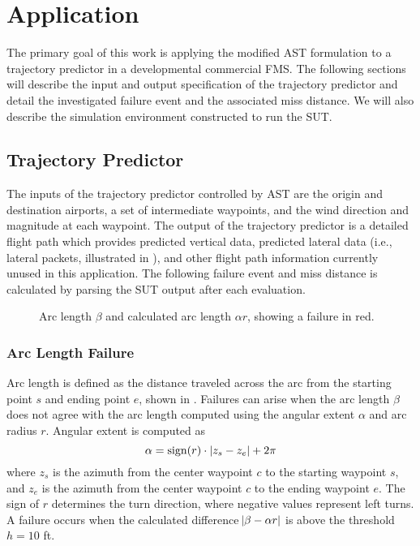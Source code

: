 \section{Application}
\label{sec:ast_application}

The primary goal of this work is applying the modified AST formulation to a trajectory predictor in a developmental commercial FMS.
The following sections will describe the input and output specification of the trajectory predictor and detail the investigated failure event and the associated miss distance.
We will also describe the simulation environment constructed to run the SUT.


\subsection{Trajectory Predictor}
The inputs of the trajectory predictor controlled by AST are the origin and destination airports, a set of intermediate waypoints, and the wind direction and magnitude at each waypoint.
The output of the trajectory predictor is a detailed flight path which provides predicted vertical data, predicted lateral data (i.e., lateral packets, illustrated in ), and other flight path information currently unused in this application.
The following failure event and miss distance is calculated by parsing the SUT output after each evaluation.


\begin{figure}[!hb]
\centering
\resizebox{0.7\columnwidth}{!}{}
\caption{Arc length $\beta$ and calculated arc length $\alpha r$, showing a failure in red.}
\label{fig:arc_length}
\end{figure}

\subsubsection{Arc Length Failure}
Arc length is defined as the distance traveled across the arc from the starting point $s$ and ending point $e$, shown in .
Failures can arise when the arc length $\beta$ does not agree with the arc length computed using the angular extent $\alpha$ and arc radius $r$.
Angular extent is computed as
\begin{equation}
  \alpha = \operatorname{sign}(r) \cdot |z_s - z_e| + 2\pi
\end{equation}
where $z_s$ is the azimuth from the center waypoint $c$ to the starting waypoint $s$, and $z_e$ is the azimuth from the center waypoint $c$ to the ending waypoint $e$.
The sign of $r$ determines the turn direction, where negative values represent left turns.
A failure occurs when the calculated difference $\abs{\beta - \alpha r}$ is above the threshold $h=10$ \si{ft}. 



